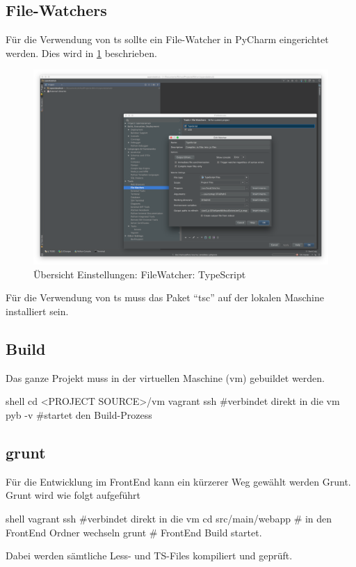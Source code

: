 \subsection{File-Watchers}
Für die Verwendung von \ac{ts} sollte ein File-Watcher in PyCharm eingerichtet werden. Dies wird in \cref{fig:sd:watcher-typescript} beschrieben.
\begin{figure}[H]
	\centering
	\includegraphics[width=\linewidth]{fig/watcher_typescript}
	\caption{Übersicht Einstellungen: FileWatcher: TypeScript}
	\label{fig:sd:watcher-typescript}
\end{figure}
Für die Verwendung von \ac{ts} muss das Paket ``tsc'' auf der lokalen Maschine installiert sein.

\subsection{Build}
Das ganze Projekt muss in der virtuellen Maschine (\acs{vm}) gebuildet werden. 
\begin{src}{shell}
cd <PROJECT SOURCE>/vm
vagrant ssh #verbindet direkt in die vm
pyb -v #startet den Build-Prozess
\end{src}
\subsection{grunt}
Für die Entwicklung im FrontEnd kann ein kürzerer Weg gewählt werden \textendash  Grunt.
Grunt wird wie folgt aufgeführt
\begin{src}{shell}
vagrant ssh #verbindet direkt in die vm
cd src/main/webapp # in den FrontEnd Ordner wechseln
grunt # FrontEnd Build startet.
\end{src}
Dabei werden sämtliche Less- und  TS-Files kompiliert und geprüft.
